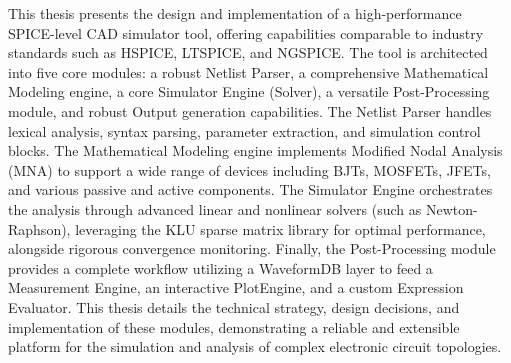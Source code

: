 \setlength{\parskip}{\baselineskip}
This thesis presents the design and implementation of a high-performance SPICE-level CAD simulator tool, offering capabilities comparable to industry standards such as HSPICE, LTSPICE, and NGSPICE. The tool is architected into five core modules: a robust Netlist Parser, a comprehensive Mathematical Modeling engine, a core Simulator Engine (Solver), a versatile Post-Processing module, and robust Output generation capabilities. The Netlist Parser handles lexical analysis, syntax parsing, parameter extraction, and simulation control blocks. The Mathematical Modeling engine implements Modified Nodal Analysis (MNA) to support a wide range of devices including BJTs, MOSFETs, JFETs, and various passive and active components. The Simulator Engine orchestrates the analysis through advanced linear and nonlinear solvers (such as Newton-Raphson), leveraging the KLU sparse matrix library for optimal performance, alongside rigorous convergence monitoring. Finally, the Post-Processing module provides a complete workflow utilizing a WaveformDB layer to feed a Measurement Engine, an interactive PlotEngine, and a custom Expression Evaluator. This thesis details the technical strategy, design decisions, and implementation of these modules, demonstrating a reliable and extensible platform for the simulation and analysis of complex electronic circuit topologies.